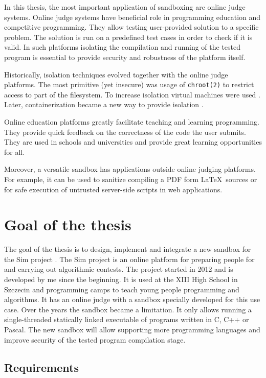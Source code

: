 \documentclass[en]{pracamgr}
\begin{document}
In this thesis, the most important application of sandboxing are online judge systems. Online judge systems have beneficial role in programming education and competitive programming. They allow testing user-provided solution to a specific problem. The solution is run on a predefined test cases in order to check if it is valid. In such platforms isolating the compilation and running of the tested program is essential to provide security and robustness of the platform itself.

Historically, isolation techniques evolved together with the online judge platforms. The most primitive (yet insecure) was usage of \texttt{chroot(2)} \cite{prevelakis2001sandboxing} to restrict access to part of the filesystem. To increase isolation virtual machines were used \cite{5635141}. Later, containerization became a new way to provide isolation \cite{marevs2012new, SPACEK20151665}.

Online education platforms greatly facilitate teaching and learning programming. They provide quick feedback on the correctness of the code the user submits. They are used in schools and universities and provide great learning opportunities for all.

Moreover, a versatile sandbox has applications outside online judging platforms. For example, it can be used to sanitize compiling a PDF form \LaTeX~sources or for safe execution of untrusted server-side scripts in web applications.

\section{Goal of the thesis}

The goal of the thesis is to design, implement and integrate a new sandbox for the Sim project \cite{sim_project}. The Sim project is an online platform for preparing people for and carrying out algorithmic contests. The project started in 2012 and is developed by me since the beginning. It is used at the XIII High School in Szczecin and programming camps to teach young people programming and algorithms. It has an online judge with a sandbox specially developed for this use case. Over the years the sandbox became a limitation. It only allows running a single-threaded statically linked executable of programs written in C, C++ or Pascal. The new sandbox will allow supporting more programming languages and improve security of the tested program compilation stage.

\subsection{Requirements}
\end{document}
